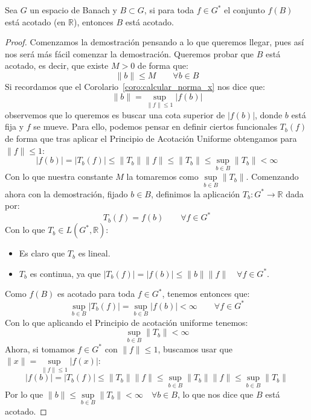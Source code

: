 \begin{coro}
    Sea $G$ un espacio de Banach y $B\subset G$, si para toda $f\in G^\ast$ el conjunto $f(B)$ está acotado (en $\mathbb{R}$), entonces $B$ está acotado.
    \begin{proof}
        Comenzamos la demostración pensando a lo que queremos llegar, pues así nos será más fácil comenzar la demostración. Queremos probar que $B$ está acotado, es decir, que existe $M>0$ de forma que:
        \begin{equation*}
            \|b\| \leq M \qquad \forall b\in B
        \end{equation*}
        Si recordamos que el Corolario~\ref{coro:calcular_norma_x} nos dice que:
        \begin{equation*}
            \|b\| = \sup_{\|f\|\leq 1}|f(b)|
        \end{equation*}
        observemos que lo queremos es buscar una cota superior de $|f(b)|$, donde $b$ está fija y $f$ se mueve. Para ello, podemos pensar en definir ciertos funcionales $T_b(f)$ de forma que tras aplicar el Principio de Acotación Uniforme obtengamos para $\|f\|\leq 1$:
        \begin{equation*}
            |f(b)| = |T_b(f)| \leq \|T_b\|\|f\| \leq \|T_b\| \leq \sup_{b\in B}\|T_b\| < \infty
        \end{equation*}
        Con lo que nuestra constante $M$ la tomaremos como $\sup\limits_{b\in B}\|T_b\|$. Comenzando ahora con la demostración, fijado $b\in B$, definimos la aplicación $T_b:G^\ast\to \mathbb{R}$ dada por:
        \begin{equation*}
            T_b(f) = f(b) \qquad \forall f\in G^\ast
        \end{equation*}
        Con lo que $T_b\in L(G^\ast,\mathbb{R})$:
        \begin{itemize}
            \item Es claro que $T_b$ es lineal.
            \item $T_b$ es continua, ya que $|T_b(f)| = |f(b)| \leq \|b\|\|f\| \quad \forall f\in G^\ast$.
        \end{itemize}
        Como $f(B)$ es acotado para toda $f\in G^\ast$, tenemos entonces que:
        \begin{equation*}
            \sup_{b\in B}|T_b(f)| = \sup_{b\in B}|f(b)| < \infty \qquad \forall f\in G^\ast
        \end{equation*}
        Con lo que aplicando el Principio de acotación uniforme tenemos: 
        \begin{equation*}
            \sup\limits_{b\in B}\|T_b\| < \infty
        \end{equation*}
        Ahora, si tomamos $f\in G^\ast$ con $\|f\|\leq 1$, buscamos usar que $\|x\| = \sup\limits_{\|f\|\leq 1}|f(x)|$:
        \begin{equation*}
            |f(b)| = |T_b(f)| \leq \|T_b\|\|f\| \leq \sup_{b\in B}\|T_b\|\|f\| \leq \sup_{b\in B}\|T_b\|
        \end{equation*}
        Por lo que $\|b\| \leq \sup\limits_{b\in B}\|T_b\| < \infty \quad \forall b\in B$, lo que nos dice que $B$ está acotado.
    \end{proof}
\end{coro}

